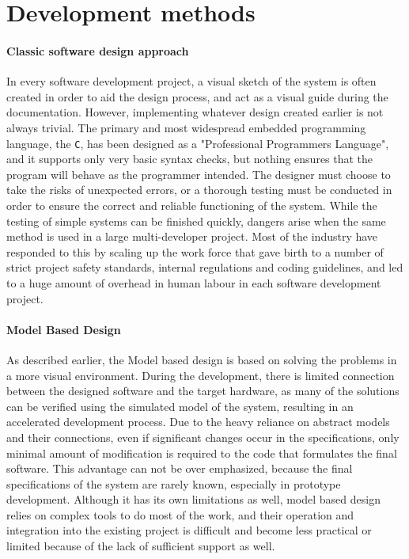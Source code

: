 \section{Development methods}

\paragraph{Classic software design approach}

In every software development project, a visual sketch of the system is often created in order to aid the design process, and act as a visual guide during the documentation. However, implementing whatever design created earlier is not always trivial. The primary and most widespread embedded programming language, the \verb!C!, has been designed as a "Professional Programmers Language", and it supports only very basic syntax checks, but nothing ensures that the program will behave as the programmer intended. The designer must choose to take the risks of unexpected errors, or a thorough testing must be conducted in order to ensure the correct and reliable functioning of the system. While the testing of simple systems can be finished quickly, dangers arise when the same method is used in a large multi-developer project. Most of the industry have responded to this by scaling up the work force that gave birth to a number of strict project safety standards, internal regulations and coding guidelines\cite{misra}, and led to a huge amount of overhead in human labour in each software development project.

\paragraph{Model Based Design}

As described earlier, the Model based design is based on solving the problems in a more visual environment. During the development, there is  limited connection between the designed software and the target hardware, as many of the solutions can be verified using the simulated model of the system, resulting in an accelerated development process\cite{locomotive}.
Due to the heavy reliance on abstract models and their connections, even if significant changes occur in the specifications, only minimal amount of modification is required to the code that formulates the final software. This advantage can not be over emphasized, because the final specifications of the system are rarely known, especially in prototype development.
Although it has its own limitations as well, model based design relies on complex tools to do most of the work, and their operation and integration into the existing project is difficult and become less practical or limited because of the lack of sufficient support as well.

